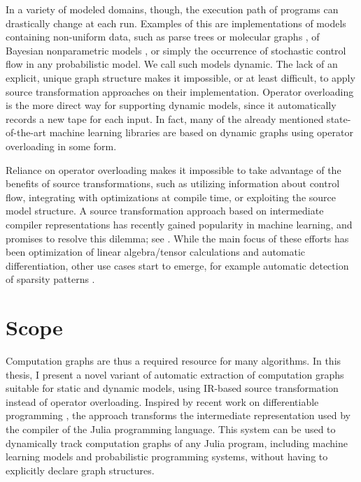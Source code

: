 In a variety of modeled domains, though, the execution path of programs can drastically change at
each run.  Examples of this are implementations of models containing non-uniform data, such as parse
trees \parencite{socher2011parsing} or molecular graphs \parencite{bianucci2000application}, of
Bayesian nonparametric models \parencite{hjort2010bayesian}, or simply the occurrence of stochastic
control flow in any probabilistic model.  We call such models dynamic.  The lack of an explicit,
unique graph structure makes it impossible, or at least difficult, to apply source transformation
approaches on their implementation.  Operator overloading is the more direct way for supporting
dynamic models, since it automatically records a new tape for each input. In fact, many of the
already mentioned state-of-the-art machine learning libraries are based on dynamic graphs using
operator overloading in some form.

Reliance on operator overloading makes it impossible to take advantage of the benefits of source
transformations, such as utilizing information about control flow, integrating with optimizations at
compile time, or exploiting the source model structure.  A source transformation approach based on
intermediate compiler representations has recently gained popularity in machine learning, and
promises to resolve this dilemma; see \textcite{bradbury2018jax,lattner2020mlir}.  While the main
focus of these efforts has been optimization of linear algebra/tensor calculations and automatic
differentiation, other use cases start to emerge, for example automatic detection of sparsity
patterns \parencite{gowda2019sparsity}.

\section{Scope}
\label{sec:scope}

Computation graphs are thus a required resource for many algorithms.  In this thesis, I present a
novel variant of automatic extraction of computation graphs suitable for static and dynamic models,
using IR-based source transformation instead of operator overloading.  Inspired by recent work on
differentiable programming \parencite{innes2018don}, the approach transforms the intermediate
representation used by the compiler of the Julia programming language.  This system can be used to
dynamically track computation graphs of any Julia program, including machine learning models and
probabilistic programming systems, without having to explicitly declare graph structures.

